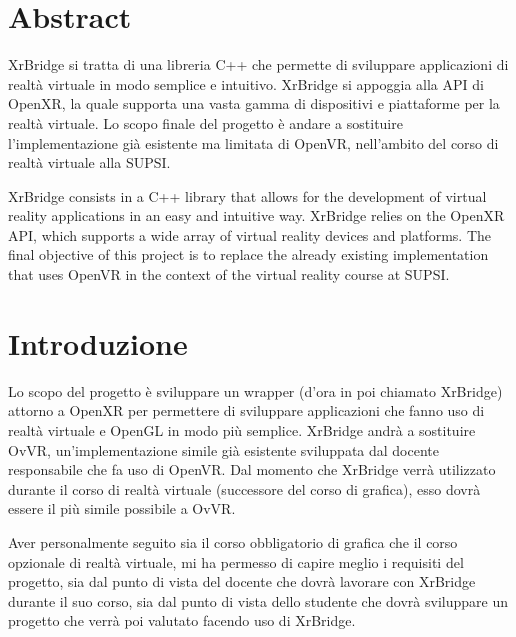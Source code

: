\documentclass[twoside]{supsistudent}
\begin{document}
\maketitle
\onehalfspacing
\frontmatter

\tableofcontents
\listoffigures					%
\listoftables					%

\newpage
\mainmatter
{}
\setcounter{page}{1}

\chapter{Abstract}

XrBridge si tratta di una libreria C++ che permette di sviluppare applicazioni di realtà virtuale in modo semplice e intuitivo. XrBridge si appoggia alla API di OpenXR, la quale supporta una vasta gamma di dispositivi e piattaforme per la realtà virtuale. Lo scopo finale del progetto è andare a sostituire l'implementazione già esistente ma limitata di OpenVR, nell'ambito del corso di realtà virtuale alla SUPSI.\newline

XrBridge consists in a C++ library that allows for the development of virtual reality applications in an easy and intuitive way. XrBridge relies on the OpenXR API, which supports a wide array of virtual reality devices and platforms. The final objective of this project is to replace the already existing implementation that uses OpenVR in the context of the virtual reality course at SUPSI.

\chapter{Introduzione}

Lo scopo del progetto è sviluppare un wrapper (d'ora in poi chiamato XrBridge) attorno a OpenXR per permettere di sviluppare applicazioni che fanno uso di realtà virtuale e OpenGL in modo più semplice. XrBridge andrà a sostituire OvVR, un'implementazione simile già esistente sviluppata dal docente responsabile che fa uso di OpenVR. Dal momento che XrBridge verrà utilizzato durante il corso di realtà virtuale (successore del corso di grafica), esso dovrà essere il più simile possibile a OvVR.

Aver personalmente seguito sia il corso obbligatorio di grafica che il corso opzionale di realtà virtuale, mi ha permesso di capire meglio i requisiti del progetto, sia dal punto di vista del docente che dovrà lavorare con XrBridge durante il suo corso, sia dal punto di vista dello studente che dovrà sviluppare un progetto che verrà poi valutato facendo uso di XrBridge.
\end{document}
